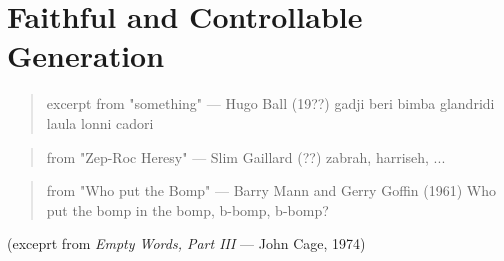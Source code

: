 \chapter{Faithful and Controllable Generation}
\label{gen}


\begin{quote}{excerpt from "something" --- Hugo Ball (19??)}
gadji beri bimba glandridi laula lonni cadori 
\end{quote}

\begin{quote}{from "Zep-Roc Heresy" --- Slim Gaillard (??)}
zabrah, harriseh, ... 
\end{quote}

\begin{quote}{from "Who put the Bomp" --- Barry Mann and Gerry Goffin (1961)}
    Who put the bomp in the bomp, b-bomp, b-bomp?
\end{quote}




\begin{singlespace}
\end{singlespace}
\par\nobreak\smallskip\hfill(exceprt from \textit{Empty Words, Part III} --- John Cage, 1974)%
~\\





















